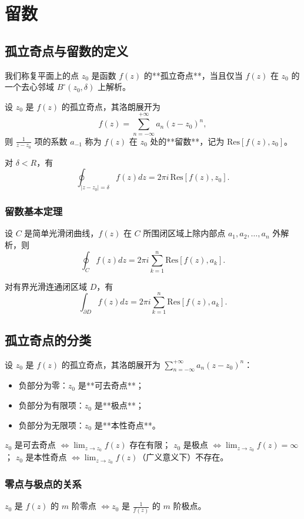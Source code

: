 \chapter{留数}

\section{孤立奇点与留数的定义}
我们称复平面上的点 \( z_0 \) 是函数 \( f(z) \) 的**孤立奇点**，当且仅当 \( f(z) \) 在 \( z_0 \) 的一个去心邻域 \( B^\circ(z_0, \delta) \) 上解析。

设 \( z_0 \) 是 \( f(z) \) 的孤立奇点，其洛朗展开为
\[
f(z) = \sum_{n=-\infty}^{+\infty} a_n (z - z_0)^n,
\]
则 \( \frac{1}{z - z_0} \) 项的系数 \( a_{-1} \) 称为 \( f(z) \) 在 \( z_0 \) 处的**留数**，记为 \( \text{Res}[f(z), z_0] \)。

对 \( \delta < R \)，有
\[
\oint_{|z - z_0| = \delta} f(z) dz = 2\pi i \, \text{Res}[f(z), z_0].
\]

\subsection{留数基本定理}
设 \( C \) 是简单光滑闭曲线，\( f(z) \) 在 \( C \) 所围闭区域上除内部点 \( a_1, a_2, \dots, a_n \) 外解析，则
\[
\oint_C f(z) dz = 2\pi i \sum_{k=1}^n \text{Res}[f(z), a_k].
\]

对有界光滑连通闭区域 \( D \)，有
\[
\int_{\partial D} f(z) dz = 2\pi i \sum_{k=1}^n \text{Res}[f(z), a_k].
\]

\section{孤立奇点的分类}
设 \( z_0 \) 是 \( f(z) \) 的孤立奇点，其洛朗展开为 \( \sum_{n=-\infty}^{+\infty} a_n (z - z_0)^n \)：
\begin{itemize}[leftmargin=2em]
    \item 负部分为零：\( z_0 \) 是**可去奇点**；
    \item 负部分为有限项：\( z_0 \) 是**极点**；
    \item 负部分为无限项：\( z_0 \) 是**本性奇点**。
\end{itemize}

\( z_0 \) 是可去奇点 \( \iff \lim_{z \to z_0} f(z) \) 存在有限；
\( z_0 \) 是极点 \( \iff \lim_{z \to z_0} f(z) = \infty \)；
\( z_0 \) 是本性奇点 \( \iff \lim_{z \to z_0} f(z) \)（广义意义下）不存在。

\subsection{零点与极点的关系}
\( z_0 \) 是 \( f(z) \) 的 \( m \) 阶零点 \( \iff z_0 \) 是 \( \frac{1}{f(z)} \) 的 \( m \) 阶极点。

